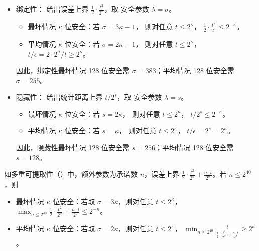 \documentclass[american,singlepageview]{snargs-book-zh}
\newcommand{\ROQueryBound}{t}
\newcommand{\SecurityParameter}{\lambda}
\newcommand{\ROOutputSize}{\sigma}
\newcommand{\SecurityLevel}{\kappa}
\newcommand{\ResourceBound}{t}
\newcommand{\ErrorBound}{\epsilon}
\newcommand{\CMSaltSize}{s}
\newcommand{\CMNumCommitments}{n}
\newcommand{\CMBindingExpression}[2]{\frac{1}{2} \cdot \frac{#2^2}{2^{#1}}}
\newcommand{\CMMultiExtractabilityExpression}[3]{\frac{1}{2} \cdot \frac{#2^2}{2^{#1}} + \frac{#3 \cdot #2}{2^{#1}}}
\begin{document}
\begin{itemize}[noitemsep]
  \item 绑定性： 给出误差上界
    $\CMBindingExpression{\ROOutputSize}{\ROQueryBound}$，取
    安全参数 $\SecurityParameter=\ROOutputSize$。
  \begin{itemize}[noitemsep]
    \item 最坏情况 $\SecurityLevel$ 位安全：若
      $\ROOutputSize=3\SecurityLevel-1$，
      则对任意 $\ROQueryBound\le2^{\SecurityLevel}$，
      $\CMBindingExpression{\ROOutputSize}{\ROQueryBound}\le2^{-\SecurityLevel}$。
    \item 平均情况 $\SecurityLevel$ 位安全：若
      $\ROOutputSize=2\SecurityLevel-1$，
      则对任意 $\ROQueryBound\le2^{\SecurityLevel}$，
      $\ResourceBound/\ErrorBound
      =2\cdot2^{\ROOutputSize}/\ROQueryBound\ge2^{\SecurityLevel}$。
  \end{itemize}
  因此，绑定性最坏情况 128 位安全需 $\ROOutputSize=383$；平均情况 128 位安全需 $\ROOutputSize=255$。

  \item 隐藏性： 给出统计距离上界
    $\ROQueryBound/2^{\CMSaltSize}$，取
    安全参数 $\SecurityParameter=\CMSaltSize$。
  \begin{itemize}[noitemsep]
    \item 最坏情况 $\SecurityLevel$ 位安全：若
      $\CMSaltSize=2\SecurityLevel$，
      则对任意 $\ROQueryBound\le2^{\SecurityLevel}$，
      $\ROQueryBound/2^{\CMSaltSize}\le2^{-\SecurityLevel}$。
    \item 平均情况 $\SecurityLevel$ 位安全：若
      $\CMSaltSize=\SecurityLevel$，
      则对任意 $\ROQueryBound\le2^{\SecurityLevel}$，
      $\ResourceBound/\ErrorBound
      =2^{\CMSaltSize}=2^{\SecurityLevel}$。
  \end{itemize}
  因此，隐藏性最坏情况 128 位安全需 $\CMSaltSize=256$；平均情况 128 位安全需 $\CMSaltSize=128$。
\end{itemize}

如多重可提取性（）中，额外参数为承诺数 $\CMNumCommitments$，误差上界
$\CMMultiExtractabilityExpression{\ROOutputSize}{\ROQueryBound}{\CMNumCommitments}$。若 $\CMNumCommitments\le2^{40}$，则

\begin{itemize}[noitemsep]
  \item 最坏情况 $\SecurityLevel$ 位安全：若取
    $\ROOutputSize=3\SecurityLevel$，则对任意
    $\ROQueryBound\le2^{\SecurityLevel}$，
    $\max_{\CMNumCommitments\le2^{40}}
    \CMMultiExtractabilityExpression{\ROOutputSize}{\ROQueryBound}{\CMNumCommitments}
    \le2^{-\SecurityLevel}$。
  \item 平均情况 $\SecurityLevel$ 位安全：若取
    $\ROOutputSize=2\SecurityLevel$，则对任意
    $\ROQueryBound\le2^{\SecurityLevel}$，
    $\min_{\CMNumCommitments\le2^{40}}
    \frac{\ROQueryBound}
    {\CMMultiExtractabilityExpression{\ROOutputSize}{\ROQueryBound}{\CMNumCommitments}}
    \ge2^{\SecurityLevel}$。
\end{itemize}
\end{document}
